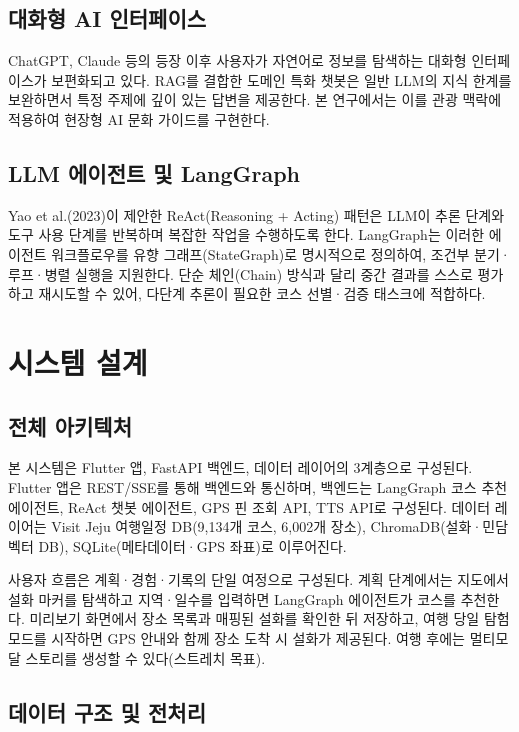 \documentclass[10pt,twocolumn,a4paper]{article}
\begin{document}
\subsection{대화형 AI 인터페이스}

ChatGPT, Claude 등의 등장 이후 사용자가 자연어로 정보를 탐색하는 대화형
인터페이스가 보편화되고 있다. RAG를 결합한 도메인 특화 챗봇은 일반 LLM의
지식 한계를 보완하면서 특정 주제에 깊이 있는 답변을 제공한다. 본 연구에서는
이를 관광 맥락에 적용하여 현장형 AI 문화 가이드를 구현한다.

\subsection{LLM 에이전트 및 LangGraph}

Yao et al.(2023)이 제안한 ReAct(Reasoning + Acting) 패턴은 LLM이 추론
단계와 도구 사용 단계를 반복하며 복잡한 작업을 수행하도록 한다. LangGraph는
이러한 에이전트 워크플로우를 유향 그래프(StateGraph)로 명시적으로 정의하여,
조건부 분기·루프·병렬 실행을 지원한다. 단순 체인(Chain) 방식과 달리 중간
결과를 스스로 평가하고 재시도할 수 있어, 다단계 추론이 필요한 코스
선별·검증 태스크에 적합하다.

\section{시스템 설계}

\subsection{전체 아키텍처}

본 시스템은 Flutter 앱, FastAPI 백엔드, 데이터 레이어의 3계층으로 구성된다.
Flutter 앱은 REST/SSE를 통해 백엔드와 통신하며, 백엔드는 LangGraph 코스
추천 에이전트, ReAct 챗봇 에이전트, GPS 핀 조회 API, TTS API로 구성된다.
데이터 레이어는 Visit Jeju 여행일정 DB(9,134개 코스, 6,002개 장소),
ChromaDB(설화·민담 벡터 DB), SQLite(메타데이터·GPS 좌표)로 이루어진다.

사용자 흐름은 계획·경험·기록의 단일 여정으로 구성된다. 계획 단계에서는
지도에서 설화 마커를 탐색하고 지역·일수를 입력하면 LangGraph 에이전트가
코스를 추천한다. 미리보기 화면에서 장소 목록과 매핑된 설화를 확인한 뒤
저장하고, 여행 당일 탐험 모드를 시작하면 GPS 안내와 함께 장소 도착 시
설화가 제공된다. 여행 후에는 멀티모달 스토리를 생성할 수 있다(스트레치
목표).

\subsection{데이터 구조 및 전처리}
\end{document}
